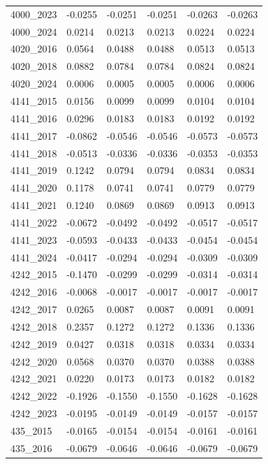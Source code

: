 \begin{table}[htbp]
\begin{tabular}{llllll}
4000_2023 & -0.0255 & -0.0251 & -0.0251 & -0.0263 & -0.0263 \\
4000_2024 & 0.0214 & 0.0213 & 0.0213 & 0.0224 & 0.0224 \\
4020_2016 & 0.0564 & 0.0488 & 0.0488 & 0.0513 & 0.0513 \\
4020_2018 & 0.0882 & 0.0784 & 0.0784 & 0.0824 & 0.0824 \\
4020_2024 & 0.0006 & 0.0005 & 0.0005 & 0.0006 & 0.0006 \\
4141_2015 & 0.0156 & 0.0099 & 0.0099 & 0.0104 & 0.0104 \\
4141_2016 & 0.0296 & 0.0183 & 0.0183 & 0.0192 & 0.0192 \\
4141_2017 & -0.0862 & -0.0546 & -0.0546 & -0.0573 & -0.0573 \\
4141_2018 & -0.0513 & -0.0336 & -0.0336 & -0.0353 & -0.0353 \\
4141_2019 & 0.1242 & 0.0794 & 0.0794 & 0.0834 & 0.0834 \\
4141_2020 & 0.1178 & 0.0741 & 0.0741 & 0.0779 & 0.0779 \\
4141_2021 & 0.1240 & 0.0869 & 0.0869 & 0.0913 & 0.0913 \\
4141_2022 & -0.0672 & -0.0492 & -0.0492 & -0.0517 & -0.0517 \\
4141_2023 & -0.0593 & -0.0433 & -0.0433 & -0.0454 & -0.0454 \\
4141_2024 & -0.0417 & -0.0294 & -0.0294 & -0.0309 & -0.0309 \\
4242_2015 & -0.1470 & -0.0299 & -0.0299 & -0.0314 & -0.0314 \\
4242_2016 & -0.0068 & -0.0017 & -0.0017 & -0.0017 & -0.0017 \\
4242_2017 & 0.0265 & 0.0087 & 0.0087 & 0.0091 & 0.0091 \\
4242_2018 & 0.2357 & 0.1272 & 0.1272 & 0.1336 & 0.1336 \\
4242_2019 & 0.0427 & 0.0318 & 0.0318 & 0.0334 & 0.0334 \\
4242_2020 & 0.0568 & 0.0370 & 0.0370 & 0.0388 & 0.0388 \\
4242_2021 & 0.0220 & 0.0173 & 0.0173 & 0.0182 & 0.0182 \\
4242_2022 & -0.1926 & -0.1550 & -0.1550 & -0.1628 & -0.1628 \\
4242_2023 & -0.0195 & -0.0149 & -0.0149 & -0.0157 & -0.0157 \\
435_2015 & -0.0165 & -0.0154 & -0.0154 & -0.0161 & -0.0161 \\
435_2016 & -0.0679 & -0.0646 & -0.0646 & -0.0679 & -0.0679 \\

\end{tabular}
\end{table}
